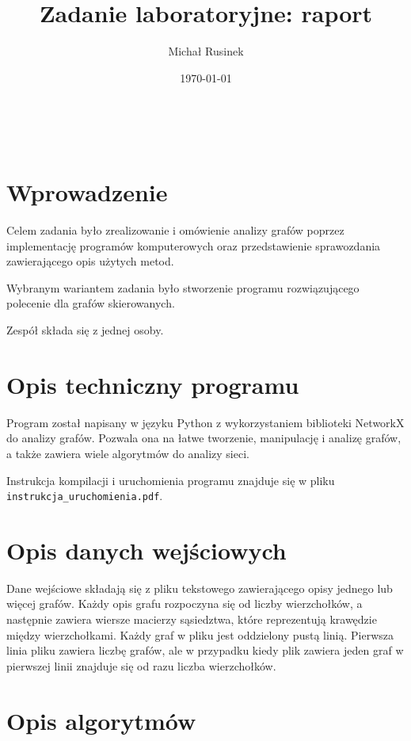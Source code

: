 \documentclass[a4paper, 12pt]{article}
\title{Zadanie laboratoryjne: raport}
\author{Michał Rusinek}
\date{\today}
\begin{document}
\maketitle
\thispagestyle{empty}
\newpage

\
\thispagestyle{empty}
\newpage


\tableofcontents
\thispagestyle{empty}
\newpage

\section*{Wprowadzenie}

Celem zadania było zrealizowanie i omówienie analizy grafów poprzez implementację programów komputerowych oraz przedstawienie sprawozdania zawierającego opis użytych metod.

Wybranym wariantem zadania było stworzenie programu rozwiązującego polecenie dla grafów skierowanych.

Zespół składa się z jednej osoby.

\section{Opis techniczny programu}

Program został napisany w języku Python z wykorzystaniem biblioteki NetworkX do analizy grafów. Pozwala ona na łatwe tworzenie, manipulację i analizę grafów, a także zawiera wiele algorytmów do analizy sieci.

Instrukcja kompilacji i uruchomienia programu znajduje się w pliku\\
\texttt{instrukcja\_uruchomienia.pdf}.

\section{Opis danych wejściowych}

Dane wejściowe składają się z pliku tekstowego zawierającego opisy jednego lub więcej grafów. Każdy opis grafu rozpoczyna się od liczby wierzchołków, a następnie zawiera wiersze macierzy sąsiedztwa, które reprezentują krawędzie między wierzchołkami. Każdy graf w pliku jest oddzielony pustą linią. Pierwsza linia pliku zawiera liczbę grafów, ale w przypadku kiedy plik zawiera jeden graf w pierwszej linii znajduje się od razu liczba wierzchołków.

\section{Opis algorytmów}
\end{document}
